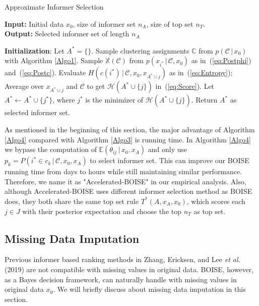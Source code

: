 \documentclass[12pt]{article}
\begin{document}
\begin{algorithm}
\caption{Approximate Informer Selection}\label{Algo4}
\hspace*{\algorithmicindent} \textbf{Input:} Initial data $x_0$, size of informer set $n_A$, size of top set $n_T$.\\
\hspace*{\algorithmicindent} \textbf{Output:} Selected informer set of length $n_A$
\begin{algorithmic}[1]
\State \textbf{Initialization}: Let $A^* = \{\}$. Sample clustering assignments $\mathbb C$ from $p(\mathcal C\,|\, x_0)$ with Algorithm \ref{Algo1}.
    \State Sample $\mathbb{X}(\mathcal{C})$ from $p\left(x_{i^*}\,|\, \mathcal C,x_0\right)$ as in~(\ref{eq:Postphi}) and~(\ref{eq:Postc}).
\EndFor
{}
            \State Evaluate $H(c(i^*)\,|\,\mathcal{C},x_0,x_{A^*\cup j})$ as in~(\ref{eq:Entropy});
        \EndFor
        \State Average over $x_{A^*\cup j}$ and $\mathcal{C}$ to get $\mathcal H(A^*\cup\{j\} )$ in~(\ref{eq:Score}). 
    \EndFor
    \State Let $A^*\gets A^*\cup \{j^*\}$, where $j^*$ is the minimizer of $\mathcal H(A^*\cup\{j\})$.
\EndWhile
\State Return $A^*$ as selected informer set.
\end{algorithmic}
\end{algorithm}
As mentioned in the beginning of this section, the major advantage of Algorithm \ref{Algo4} compared with Algorithm \ref{Algo3} is running time. In Algorithm \ref{Algo4} we bypass the computation of $\mathbb E\left(\theta_{ij}\,|\, x_0,x_A\right)$ and only use $p_k = P(i^*\in c_k\,|\, \mathcal C,x_0,x_A)$ to select informer set. This can improve our BOISE running time from days to hours while still maintaining similar performance. Therefore, we name it as "Accelerated-BOISE" in our empirical analysis. Also, although Accelerated-BOISE uses different informer selection method as BOISE does, they both share the same top set rule $T^*(A,x_A,x_0)$, which scores each $j\in J$ with their posterior expectation and choose the top $n_T$ as top set.  

\subsection{Missing Data Imputation}
Previous informer based ranking methods in Zhang, Ericksen, and Lee {\em et al.} (2019) are not compatible with missing values in original data. BOISE, however, as a Bayes decision framework, can naturally handle with missing values in original data $x_0$. We will briefly discuss about missing data imputation in this section. 
\end{document}
